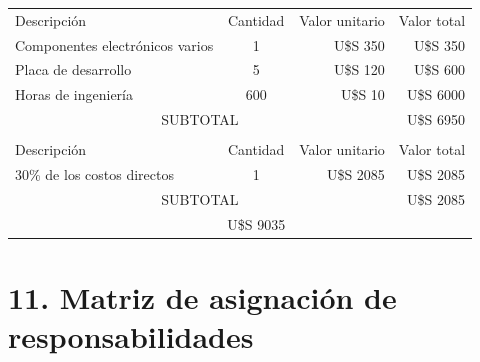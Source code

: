 \documentclass[11pt]{charter}
\begin{document}
\begin{table}[htpb]
\centering
\begin{tabularx}{\linewidth}{@{}|X|c|r|r|@{}}
\hline
\rowcolor[HTML]{C0C0C0} 
\multicolumn{4}{|c|}{\cellcolor[HTML]{C0C0C0}COSTOS DIRECTOS} \\ \hline
\rowcolor[HTML]{C0C0C0} 
Descripción &
  \multicolumn{1}{c|}{\cellcolor[HTML]{C0C0C0}Cantidad} &
  \multicolumn{1}{c|}{\cellcolor[HTML]{C0C0C0}Valor unitario} &
  \multicolumn{1}{c|}{\cellcolor[HTML]{C0C0C0}Valor total} \\ \hline
 Componentes electrónicos varios &
  1 &
  U\$S 350 &
   U\$S 350 \\ \hline
 Placa de desarrollo &
  5 &
  U\$S 120 &
  U\$S 600 \\ \hline
Horas de ingeniería &
  600 &
  U\$S 10 &
  U\$S 6000 \\ \hline
\multicolumn{3}{|c|}{SUBTOTAL} &
  U\$S 6950 \\ \hline
\rowcolor[HTML]{C0C0C0} 
\multicolumn{4}{|c|}{\cellcolor[HTML]{C0C0C0}COSTOS INDIRECTOS} \\ \hline
\rowcolor[HTML]{C0C0C0} 
Descripción &
  \multicolumn{1}{c|}{\cellcolor[HTML]{C0C0C0}Cantidad} &
  \multicolumn{1}{c|}{\cellcolor[HTML]{C0C0C0}Valor unitario} &
  \multicolumn{1}{c|}{\cellcolor[HTML]{C0C0C0}Valor total} \\ \hline
30\% de los costos directos &
  1 &
  U\$S 2085 &
  U\$S 2085 \\ \hline
\multicolumn{3}{|c|}{SUBTOTAL} &
  U\$S 2085 \\ \hline
\rowcolor[HTML]{C0C0C0}
\multicolumn{3}{|c|}{TOTAL} &
  U\$S 9035 \\ \hline
\end{tabularx}%
\end{table}


\section{11. Matriz de asignación de responsabilidades}
\label{sec:responsabilidades}
\end{document}

